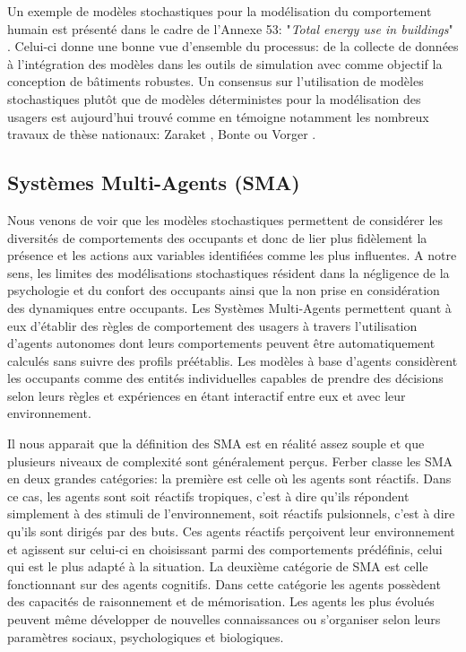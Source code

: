 Un exemple de modèles stochastiques pour la modélisation du comportement humain est présenté dans le cadre de l'Annexe 53: "\textit{Total energy use in buildings}" \cite{Annex-53-1}. Celui-ci donne une bonne vue d'ensemble du processus: de la collecte de données à l'intégration des modèles dans les outils de simulation avec comme objectif la conception de bâtiments robustes. Un consensus sur l'utilisation de modèles stochastiques plutôt que de modèles déterministes pour la modélisation des usagers est aujourd'hui trouvé comme en témoigne notamment les nombreux travaux de thèse nationaux: Zaraket \cite{Zaraket-14}, Bonte \cite{Bonte-14} ou Vorger \cite{Vorger-14}.

\subsection{Systèmes Multi-Agents (SMA)}
\label{Systèmes Multi-Agents}

Nous venons de voir que les modèles stochastiques permettent de considérer les diversités de comportements des occupants et donc de lier plus fidèlement la présence et les actions aux variables identifiées comme les plus influentes. A notre sens, les limites des modélisations stochastiques résident dans la négligence de la psychologie et du confort des occupants ainsi que la non prise en considération des dynamiques entre occupants. Les Systèmes Multi-Agents permettent quant à eux d'établir des règles de comportement des usagers à travers l'utilisation d'agents autonomes dont leurs comportements peuvent être automatiquement calculés sans suivre des profils préétablis. Les modèles à base d'agents considèrent les occupants comme des entités individuelles capables de prendre des décisions selon leurs règles et expériences en étant interactif entre eux et avec leur environnement.

Il nous apparait que la définition des SMA est en réalité assez souple et que plusieurs niveaux de complexité sont généralement perçus. Ferber \cite{Ferber-95} classe les SMA en deux grandes catégories: la première est celle où les agents sont réactifs. Dans ce cas, les agents sont soit réactifs tropiques, c'est à dire qu'ils répondent simplement à des stimuli de l'environnement, soit réactifs pulsionnels, c'est à dire qu'ils sont dirigés par des buts. Ces agents réactifs perçoivent leur environnement et agissent sur celui-ci en choisissant parmi des comportements prédéfinis, celui qui est le plus adapté à la situation. La deuxième catégorie de SMA est celle fonctionnant sur des agents cognitifs. Dans cette catégorie les agents possèdent des capacités de raisonnement et de mémorisation. Les agents les plus évolués peuvent même développer de nouvelles connaissances ou s'organiser selon leurs paramètres sociaux, psychologiques et biologiques.


